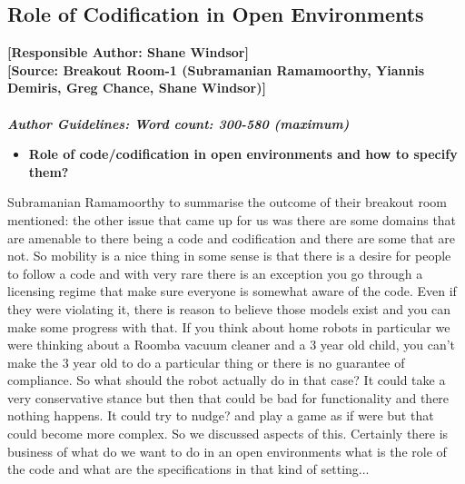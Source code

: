\documentclass[sigconf]{acmart}
\begin{document}
\subsection{Role of Codification in Open Environments}
\noindent\textbf{[Responsible Author:  Shane Windsor]}\\
\noindent \textbf{[Source: Breakout Room-1 (Subramanian Ramamoorthy, Yiannis Demiris, Greg Chance, Shane Windsor)]}\\\\
\noindent\textbf{\textit{Author Guidelines: Word count: 300-580 (maximum)}}\\
\begin{itemize}
	\item \textbf{Role of code/codification in open environments and how to specify them?}
\end{itemize}
Subramanian Ramamoorthy to summarise the outcome of their breakout room mentioned: the other issue that came up for us was there are some domains that are amenable to there being a code and codification and there are some that are not. So mobility is a nice thing in some sense is that there is a desire for people to follow a code and with very rare there is an exception you go through a licensing regime that make sure everyone is somewhat aware of the code. Even if they were violating it, there is reason to believe those models exist and you can make some progress with that.
If you think about home robots in particular we were thinking about a Roomba vacuum cleaner and a  3 year old child, you can't make the 3 year old to do a particular thing or there is no guarantee of compliance. So what should the robot actually do in that case? It could take a very conservative stance but then that could be bad for functionality and there nothing happens.
It could try to nudge? and play a game as if were but that could become more complex.
So we discussed aspects of this. 
Certainly there is business of what do we want to do in an open environments what is the role of the code and what are the specifications in that kind of setting... 
\end{document}
